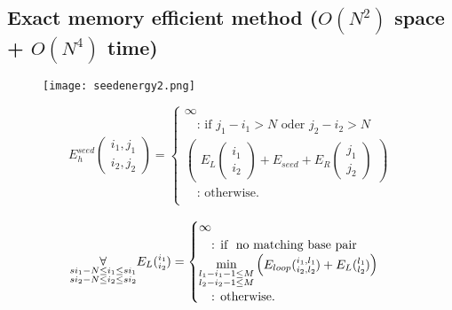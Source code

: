 \clearpage

\subsection{Exact memory efficient method ($O(N^{2})$ space + $O(N^{4})$ time)}

\begin{figure}[H]
	\centering
	\texttt{[image: seedenergy2.png]}
\end{figure}

\begin{equation*}
E_{h}^{seed}(\substack{i_1,j_1\\i_2,j_2}) = \begin{cases}
\infty\\
\quad\text{: if } j_{1} - i_{1} > N \text{ oder } j_{2} - i_{2} > N\\
\begin{pmatrix}
E_{L}(\substack{i_1\\i_2}) + E_{seed} + E_{R}(\substack{j_1\\j_2})
\end{pmatrix}\\
\quad\text{: otherwise.}\\
\end{cases}
\end{equation*}

\begin{equation*}
\underset{\substack{si_{1}-N \le i_{1} \le si_{1}\\si_{2}-N \le i_{2} \le si_{2}}}{\forall}\\
E_L(\substack{i_1\\i_2}) = \begin{cases}
\infty\\
\quad\text{: if } \text{ no matching base pair }\\
\min\limits_{\substack{l_{1} - i_{1} - 1 \le M\\l_{2} - i_{2} - 1 \le M}}
\begin{pmatrix}
E_{loop}(\substack{i_1,l_1\\i_2,l_2}) + E_L(\substack{l_1\\l_2})
\end{pmatrix}\\
\quad\text{: otherwise.}\\

\end{cases}
\end{equation*}

